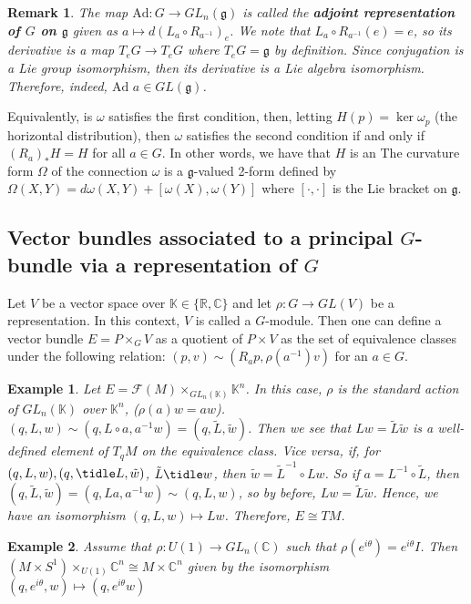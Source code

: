 \documentclass{article}
\newcommand{\R}{\mathbb R}
\newcommand{\C}{\mathbb C}
\newcommand{\nl}{\newline\newline\noindent}
\newcommand{\w}{\omega}
\newtheorem{ex}{Example}
\newtheorem{rk}{Remark}
\begin{document}
\begin{rk}
    The map $\text{Ad}:G\to GL_n(\mathfrak{g})$ is called the \textbf{adjoint representation of $G$ on $\mathfrak g$} given as $a\mapsto d(L_a\circ R_{a^{-1}})_e$. We note that $L_a\circ R_{a^{-1}}(e) = e$, so its derivative is a map $T_eG \to T_eG$ where $T_eG = \mathfrak{g}$ by definition. Since conjugation is a Lie group isomorphism, then its derivative is a Lie algebra isomorphism. Therefore, indeed, $\text{Ad }a\in GL(\mathfrak{g})$.
\end{rk}
\nl
Equivalently, is $\w$ satisfies the first condition, then, letting $H(p) = \ker\w_p$ (the horizontal distribution), then $\w$ satisfies the second condition if and only if $(R_a)_*H = H$ for all $a\in G$. In other words, we have that $H$ is an 
\nl
The curvature form $\Omega$ of the connection $\w$ is a $\mathfrak{g}$-valued 2-form defined by $\Omega(X,Y) = d\w(X,Y) + [\w(X),\w(Y)]$ where $[\cdot,\cdot]$ is the Lie bracket on $\mathfrak{g}$.
\nl
\subsection{Vector bundles associated to a principal $G$-bundle via a representation of $G$}
Let $V$ be a vector space over $\mathbb K \in \{\R,\C\}$ and let $\rho: G\to GL(V)$ be a representation. In this context, $V$ is called a $G$-module. Then one can define a vector bundle $E = P\times_G V$ as a quotient of $P\times V$ as the set of equivalence classes under the following relation: $(p,v)\sim (R_a p,\rho(a^{-1})v)$ for an $a\in G$.
\begin{ex}
    Let $E = \mathcal{F}(M)\times_{GL_n(\mathbb K)}\mathbb K^n$. In this case, $\rho$ is the standard action of $GL_n(\mathbb K)$ over $\mathbb K^n$, ($\rho(a)w = aw$). $(q,L,w)\sim (q,L\circ a, a^{-1}w) = (q,\tilde L,\tilde w)$. Then we see that $Lw = \tilde L \tilde w$ is a well-defined element of $T_qM$ on the equivalence class. Vice versa, if, for $(q,L,w), (q,\tidle L, \tilde w)$, $\tilde L\tidle w$, then $\tilde w = \tilde L^{-1}\circ L w$. So if $a = L^{-1}\circ \tilde L$, then $(q,\tilde L, \tilde w) = (q, La, a^{-1} w)\sim (q, L,w)$, so by before, $Lw = \tilde L\tilde w$. Hence, we have an isomorphism $(q,L,w)\mapsto Lw$. Therefore, $E\cong TM$.
\end{ex}
\begin{ex}
    Assume that $\rho: U(1)\to GL_n(\C)$ such that $\rho(e^{i\theta}) = e^{i\theta}I$. Then $(M\times S^1)\times_{U(1)}\C^n\cong M\times \C^n$ given by the isomorphism $(q,e^{i\theta},w)\mapsto (q,e^{i\theta}w)$
\end{ex}
\end{document}
